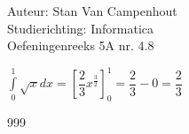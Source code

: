 \documentclass[a4paper]{article}
\begin{document}
  
\noindent \large Auteur: Stan Van Campenhout \\
\noindent \large Studierichting:  Informatica\\
\noindent \large Oefeningenreeks 5A nr. 4.8\\

\medskip

\normalsize

$ \displaystyle\int\limits_0^1\sqrt{x} dx = \left[\dfrac{2}{3}x^{\tfrac{3}{2}}\right]_0^1 = \dfrac{2}{3} - 0 = \dfrac{2}{3} $\\

\begin{thebibliography}{999}
\end{thebibliography}
\end{document}
